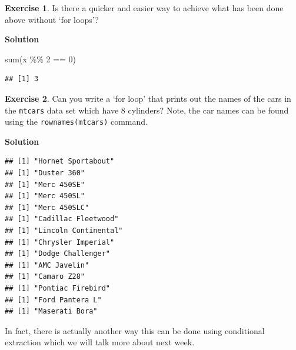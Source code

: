 \documentclass[
]{book}
\newenvironment{Shaded}{\begin{snugshade}}{\end{snugshade}}
\newcommand{\ControlFlowTok}[1]{\textcolor[rgb]{0.13,0.29,0.53}{\textbf{#1}}}
\newcommand{\DecValTok}[1]{\textcolor[rgb]{0.00,0.00,0.81}{#1}}
\newcommand{\FunctionTok}[1]{\textcolor[rgb]{0.00,0.00,0.00}{#1}}
\newcommand{\NormalTok}[1]{#1}
\newcommand{\SpecialCharTok}[1]{\textcolor[rgb]{0.00,0.00,0.00}{#1}}
\theoremstyle{definition}
\theoremstyle{definition}
\theoremstyle{definition}
\newtheorem{exercise}{Exercise}[chapter]
\theoremstyle{definition}
\theoremstyle{remark}
\begin{document}
\begin{exercise}
Is there a quicker and easier way to achieve what has been done above without `for loops'?
\end{exercise}

\textbf{Solution}

\begin{Shaded}
\begin{Highlighting}[]
\FunctionTok{sum}\NormalTok{(x }\SpecialCharTok{\%\%} \DecValTok{2} \SpecialCharTok{==} \DecValTok{0}\NormalTok{)}
\end{Highlighting}
\end{Shaded}

\begin{verbatim}
## [1] 3
\end{verbatim}

\begin{exercise}
Can you write a `for loop' that prints out the names of the cars in the \texttt{mtcars} data set which have 8 cylinders? Note, the car names can be found using the \texttt{rownames(mtcars)} command.
\end{exercise}

\textbf{Solution}

\begin{Shaded}
\end{Shaded}

\begin{verbatim}
## [1] "Hornet Sportabout"
## [1] "Duster 360"
## [1] "Merc 450SE"
## [1] "Merc 450SL"
## [1] "Merc 450SLC"
## [1] "Cadillac Fleetwood"
## [1] "Lincoln Continental"
## [1] "Chrysler Imperial"
## [1] "Dodge Challenger"
## [1] "AMC Javelin"
## [1] "Camaro Z28"
## [1] "Pontiac Firebird"
## [1] "Ford Pantera L"
## [1] "Maserati Bora"
\end{verbatim}

In fact, there is actually another way this can be done using conditional extraction which we will talk more about next week.
\end{document}
